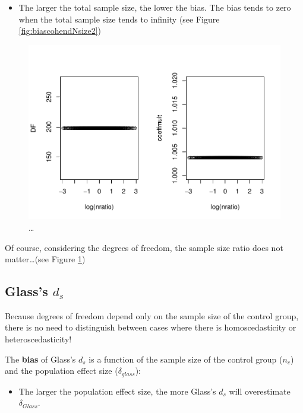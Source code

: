 \documentclass[
  man]{apa6}
\providecommand{\tightlist}{%
  \setlength{\itemsep}{0pt}\setlength{\parskip}{0pt}}
\begin{document}
\begin{itemize}
\tightlist
\item
  The larger the total sample size, the lower the bias. The bias tends to zero when the total sample size tends to infinity (see Figure \ref{fig:biascohendNsize2})
\end{itemize}

\begin{figure}
\centering
\includegraphics{Theoretical-Bias-and-variance,-as-a-function-of-population-parameters_files/figure-latex/biascohendNratio2-1.pdf}
\caption{\label{fig:biascohendNratio2}\ldots{}}
\end{figure}

Of course, considering the degrees of freedom, the sample size ratio does not matter\ldots(see Figure \ref{fig:biascohendNratio2})

\hypertarget{glasss-d_s}{%
\subsection{\texorpdfstring{Glass's \(d_s\)}{Glass's d\_s}}\label{glasss-d_s}}

Because degrees of freedom depend only on the sample size of the control group, there is no need to distinguish between cases where there is homoscedasticity or heteroscedasticity!

The \textbf{bias} of Glass's \(d_s\) is a function of the sample size of the control group (\(n_c\)) and the population effect size (\(\delta_{glass}\)):

\begin{itemize}
\tightlist
\item
  The larger the population effect size, the more Glass's \(d_s\) will overestimate \(\delta_{Glass}\).
\end{itemize}
\end{document}
